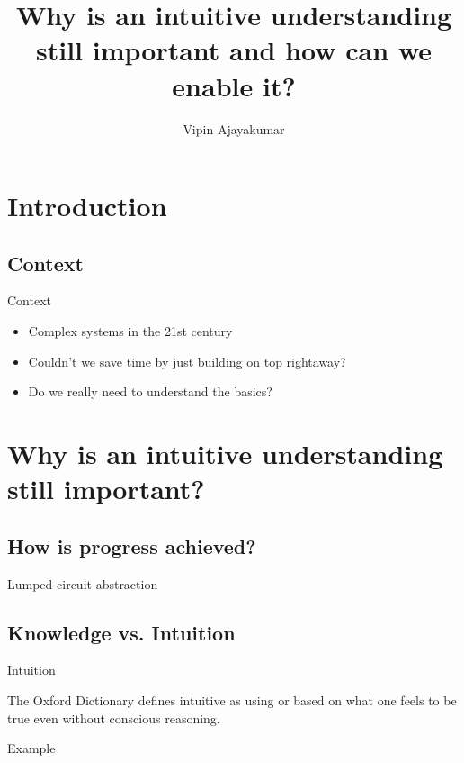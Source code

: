 \documentclass{beamer}
\title[Intuitive understanding and its enablers]{Why is an intuitive understanding still important and how can we enable it?}
\author{Vipin Ajayakumar}
\institute{Rolls-Royce}
\date{}
\begin{document}
\begin{frame}
  \titlepage
\end{frame}

\section{Introduction}
\subsection{Context}
\begin{frame}{Context}
\begin{itemize}
	  \item Complex systems in the 21st century
	  \item Couldn't we save time by just building on top rightaway?
	  \item Do we really need to understand the basics?
\end{itemize}
\end{frame}

\section{Why is an intuitive understanding still important?}
\subsection{How is progress achieved?}
\begin{frame}{Lumped circuit abstraction}
\end{frame}
\subsection{Knowledge vs. Intuition}
\begin{frame}{Intuition}
	\begin{definition}
		The Oxford Dictionary defines \alert{intuitive}  as using or based on what one feels to be true even without conscious reasoning.
	\end{definition}
\end{frame}
\begin{frame}{Example}
\end{frame}
\end{document}
